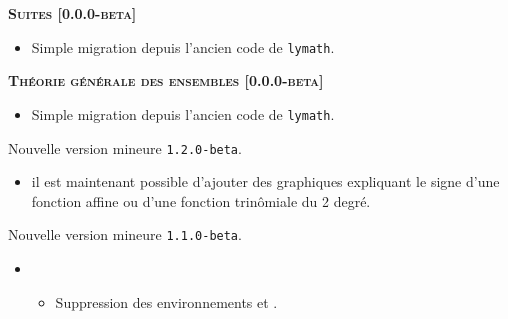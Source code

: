 \documentclass[12pt,a4paper]{book}
\begin{document}
\begin{description}
\separation




\begin{center}
    \textbf{\textsc{Suites [0.0.0-beta]}}
\end{center}

\begin{itemize}[itemsep=.5em]
    \item Simple migration depuis l'ancien code de \verb+lymath+.
\end{itemize}


\separation




\begin{center}
    \textbf{\textsc{Théorie générale des ensembles [0.0.0-beta]}}
\end{center}

\begin{itemize}[itemsep=.5em]
    \item Simple migration depuis l'ancien code de \verb+lymath+.
\end{itemize}


\separation

\end{description}\begin{description}
\medskip
\item[2020-07-05] Nouvelle version mineure \verb+1.2.0-beta+.

\begin{itemize}[itemsep=.5em]
    \item {}
          il est maintenant possible d'ajouter des graphiques expliquant le signe d'une fonction affine ou d'une fonction trinômiale du 2\ieme{} degré.
\end{itemize}
\end{description}\begin{description}
\medskip
\item[2020-06-27] Nouvelle version mineure \verb+1.1.0-beta+.

\begin{itemize}[itemsep=.5em]
    \item {}
    \begin{itemize}[itemsep=.5em]
        \item Suppression des environnements  et .

              \smallskip


\end{itemize}
\end{itemize}
\end{description}
\end{document}

